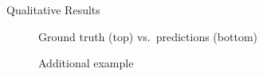 \documentclass[9pt,aspectratio=169]{beamer}
\begin{document}
\begin{frame}{Qualitative Results}
  \begin{block}{}
    \vspace{-1.0em}
    \begin{figure}
      \centering
      \vspace{-1.0em}
      \caption{Ground truth (top) vs.\ predictions (bottom)}
      \vspace{-1.0em}
    \end{figure}
    \vspace{0.4em}
    \begin{figure}
      \centering
      \vspace{-0.8em}
      \caption{Additional example}
      \vspace{-1.0em}
    \end{figure}
  \end{block}
\end{frame}
\end{document}
